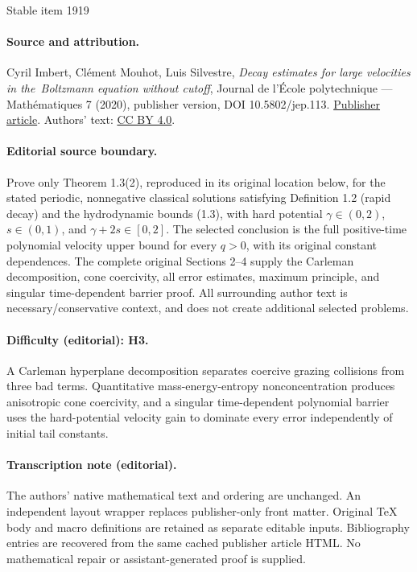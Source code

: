 \documentclass[11pt]{article}
\theoremstyle{plain}
\theoremstyle{definition}
\numberwithin{equation}{section}
\begin{document}
\begin{center}{\Large Stable item 1919}\end{center}
\paragraph{Source and attribution.}
Cyril Imbert, Clément Mouhot, Luis Silvestre, \emph{Decay estimates for large velocities in the Boltzmann equation without cutoff}, Journal de l’École polytechnique — Mathématiques 7 (2020), publisher version, DOI 10.5802/jep.113. \href{https://jep.centre-mersenne.org/articles/10.5802/jep.113/}{Publisher article}. Authors' text: \href{https://creativecommons.org/licenses/by/4.0/}{CC BY 4.0}.
\paragraph{Editorial source boundary.}
Prove only Theorem 1.3(2), reproduced in its original location below, for the stated periodic, nonnegative classical solutions satisfying Definition 1.2 (rapid decay) and the hydrodynamic bounds (1.3), with hard potential \(\gamma\in(0,2)\), \(s\in(0,1)\), and \(\gamma+2s\in[0,2]\). The selected conclusion is the full positive-time polynomial velocity upper bound for every \(q>0\), with its original constant dependences. The complete original Sections 2--4 supply the Carleman decomposition, cone coercivity, all error estimates, maximum principle, and singular time-dependent barrier proof. All surrounding author text is necessary/conservative context, and does not create additional selected problems.
\paragraph{Difficulty (editorial): H3.}
A Carleman hyperplane decomposition separates coercive grazing collisions from three bad terms. Quantitative mass-energy-entropy nonconcentration produces anisotropic cone coercivity, and a singular time-dependent polynomial barrier uses the hard-potential velocity gain to dominate every error independently of initial tail constants.
\paragraph{Transcription note (editorial).}
The authors' native mathematical text and ordering are unchanged. An independent layout wrapper replaces publisher-only front matter. Original TeX body and macro definitions are retained as separate editable inputs. Bibliography entries are recovered from the same cached publisher article HTML. No mathematical repair or assistant-generated proof is supplied.
\clearpage
\end{document}
